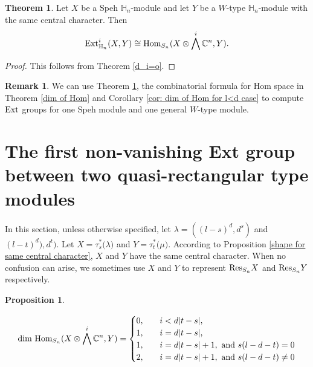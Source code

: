 \documentclass[11pt]{amsart}
\numberwithin{equation}{section}
\theoremstyle{definition}
\newtheorem{theorem}[thm]{Theorem}
\newtheorem{proposition}[thm]{Proposition}
\newtheorem{remark}[thm]{Remark}
\begin{document}
\begin{theorem} \label{thm ext in term hom}
    Let $X$ be a Speh $\mathbb H_n$-module  and let $Y$ be a $W$-type $\mathbb{H}_{n}$-module  with the same central character. Then
    \begin{equation}
    \textnormal{Ext}_{\mathbb{H}_{n}}^{i}(X, Y)\cong \textnormal{Hom}_{S_{n}}(X\otimes\bigwedge^{i}\mathbb{C}^{n},Y).
    \end{equation}
\end{theorem}

\begin{proof}
This follows from Theorem \ref{d_i=o}.
\end{proof}


\begin{remark}
    We can use Theorem \ref{thm ext in term hom}, the combinatorial formula for Hom space in Theorem \ref{dim of Hom} and Corollary \ref{cor: dim of Hom for l<d case} to compute $\textnormal{Ext}$ groups for one Speh module and one general \(W\)-type module.
\end{remark}



\section{The first non-vanishing Ext group between two quasi-rectangular type modules}\label{sec first non-vanish Ext for two quasi-rec}

In this section, unless otherwise specified, let \(\lambda =((l-s)^{d} ,d^{s})\) and \((l-t)^{d}),d^{t})\). Let $X=\tau_{s}^{*}\big(\lambda\big)$ and $Y=\tau_{t}^{*}\big(\mu\big)$. According to Proposition \ref{shape for same central character}, $X$ and $Y$ have the same central character. When no confusion can arise, we sometimes use $X$ and $Y$ to represent $\textnormal{Res}_{S_{n}}X$ and $\textnormal{Res}_{S_{n}}Y$ respectively.

\begin{proposition}\label{dim Hom for two Hook type}

    \begin{eqnarray*}
        \textnormal{dim Hom}_{S_{n}}(X\otimes\bigwedge^{i}\mathbb{C}^{n},Y)=\begin{cases}
            0,\quad &i<d|t-s|,\\
            1,\quad& i=d|t-s|,\\
               1,\quad& i=d|t-s|+1,\  \textnormal{and}\ s(l-d-t)=0\\
               2,\quad& i=d|t-s|+1,\  \textnormal{and}\ s(l-d-t)\neq0
        \end{cases}
        \end{eqnarray*}
\end{proposition}
\end{document}
